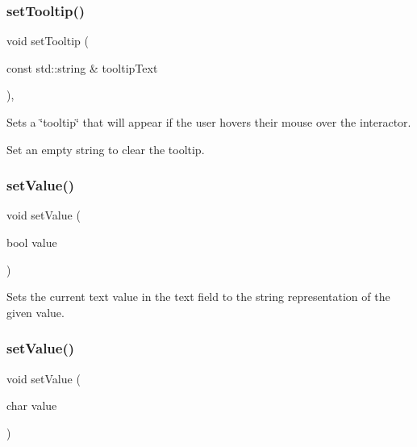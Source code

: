 \subsubsection{\texorpdfstring{set\+Tooltip()}{setTooltip()}}
{\footnotesize\ttfamily void set\+Tooltip (\begin{DoxyParamCaption}\item[{const std\+::string \&}]{tooltip\+Text }\end{DoxyParamCaption})\hspace{0.3cm}{\ttfamily [virtual]}, {\ttfamily [inherited]}}



Sets a \char`\"{}tooltip\char`\"{} that will appear if the user hovers their mouse over the interactor. 

Set an empty string to clear the tooltip. \mbox{\label{classGTextField_ae803b3348fa7076308d852bbdeea0d74}} 
\subsubsection{\texorpdfstring{set\+Value()}{setValue()}\hspace{0.1cm}{\footnotesize\ttfamily [1/5]}}
{\footnotesize\ttfamily void set\+Value (\begin{DoxyParamCaption}\item[{bool}]{value }\end{DoxyParamCaption})\hspace{0.3cm}{\ttfamily [virtual]}}



Sets the current text value in the text field to the string representation of the given value. 

\mbox{\label{classGTextField_aeefe59b3d414b657838869ce084cb0e2}} 
\subsubsection{\texorpdfstring{set\+Value()}{setValue()}\hspace{0.1cm}{\footnotesize\ttfamily [2/5]}}
{\footnotesize\ttfamily void set\+Value (\begin{DoxyParamCaption}\item[{char}]{value }\end{DoxyParamCaption})\hspace{0.3cm}{\ttfamily [virtual]}}



